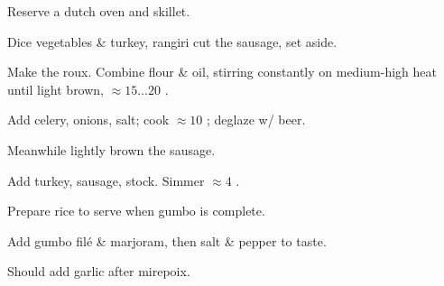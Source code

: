 \begin{preparation}
\item Reserve a dutch oven and skillet.

\item Dice vegetables \& turkey, rangiri cut the sausage, set aside.

\item Make the roux.
	Combine flour \& oil, stirring constantly on medium-high heat until light brown, $\approx 15 \ldots 20$ \minute.

\item Add celery, onions, salt; cook $\approx 10$ \minute; deglaze w/ beer.

\item Meanwhile lightly brown the sausage.

\item Add turkey, sausage, stock. Simmer $\approx 4$ \hour.

\item Prepare rice to serve when gumbo is complete.

\item Add gumbo fil\'{e} \& marjoram, then salt \& pepper to taste.
\end{preparation}


\begin{experiments}
\item Should add garlic after mirepoix.
\end{experiments}

\recipeend%
